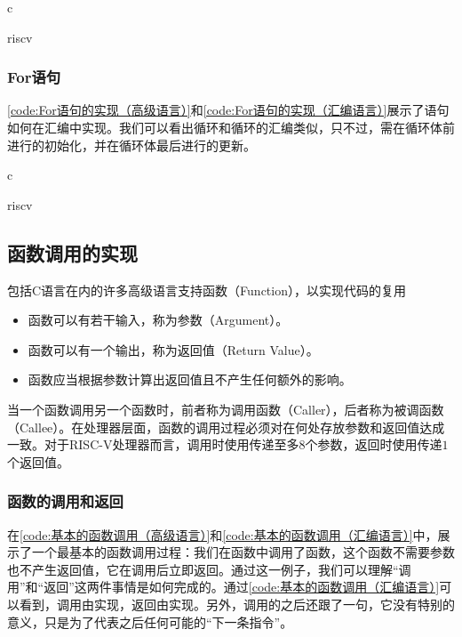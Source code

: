 \begin{Code}{c}
    
\end{Code}

\begin{Code}{riscv}
    
\end{Code}

\subsubsection{For语句}
\cref{code:For语句的实现（高级语言）}和\cref{code:For语句的实现（汇编语言）}展示了语句如何在汇编中实现。我们可以看出循环和循环的汇编类似，只不过，需在循环体前进行的初始化，并在循环体最后进行的更新。
\begin{Code}{c}
    
\end{Code}

\begin{Code}{riscv}
    
\end{Code}

\subsection{函数调用的实现}
包括C语言在内的许多高级语言支持函数（Function），以实现代码的复用
\begin{itemize}
    \item 函数可以有若干输入，称为参数（Argument）。
    \item 函数可以有一个输出，称为返回值（Return Value）。
    \item 函数应当根据参数计算出返回值且不产生任何额外的影响。
\end{itemize}
当一个函数调用另一个函数时，前者称为调用函数（Caller），后者称为被调函数（Callee）。在处理器层面，函数的调用过程必须对在何处存放参数和返回值达成一致。对于RISC-V处理器而言，调用时使用传递至多$8$个参数，返回时使用传递$1$个返回值。

\subsubsection{函数的调用和返回}
在\cref{code:基本的函数调用（高级语言）}和\cref{code:基本的函数调用（汇编语言）}中，展示了一个最基本的函数调用过程：我们在函数中调用了函数，这个函数不需要参数也不产生返回值，它在调用后立即返回。通过这一例子，我们可以理解“调用”和“返回”这两件事情是如何完成的。通过\cref{code:基本的函数调用（汇编语言）}可以看到，调用由实现，返回由实现。另外，调用的之后还跟了一句，它没有特别的意义，只是为了代表之后任何可能的“下一条指令”。

